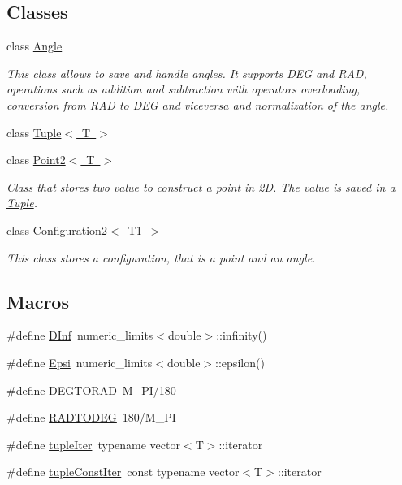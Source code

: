\subsection*{Classes}
\begin{DoxyCompactItemize}
\item 
class \mbox{\hyperlink{class_angle}{Angle}}
\begin{DoxyCompactList}\small\item\em This class allows to save and handle angles. It supports D\+EG and R\+AD, operations such as addition and subtraction with operators overloading, conversion from R\+AD to D\+EG and viceversa and normalization of the angle. \end{DoxyCompactList}\item 
class \mbox{\hyperlink{class_tuple}{Tuple$<$ T $>$}}
\item 
class \mbox{\hyperlink{class_point2}{Point2$<$ T $>$}}
\begin{DoxyCompactList}\small\item\em Class that stores two value to construct a point in 2D. The value is saved in a \mbox{\hyperlink{class_tuple}{Tuple}}. \end{DoxyCompactList}\item 
class \mbox{\hyperlink{class_configuration2}{Configuration2$<$ T1 $>$}}
\begin{DoxyCompactList}\small\item\em This class stores a configuration, that is a point and an angle. \end{DoxyCompactList}\end{DoxyCompactItemize}
\subsection*{Macros}
\begin{DoxyCompactItemize}
\item 
\#define \mbox{\hyperlink{maths_8hh_a995779faef78614d4f074b7d444de767}{D\+Inf}}~numeric\+\_\+limits$<$double$>$\+::infinity()
\item 
\#define \mbox{\hyperlink{maths_8hh_a78802b279ab85021d7f6bffe51621703}{Epsi}}~numeric\+\_\+limits$<$double$>$\+::epsilon()
\item 
\#define \mbox{\hyperlink{maths_8hh_abbfb1b8e88373781c6238d647110f5d2}{D\+E\+G\+T\+O\+R\+AD}}~M\+\_\+\+PI/180
\item 
\#define \mbox{\hyperlink{maths_8hh_a9fcbc53371e9a60b983c6b338537aa40}{R\+A\+D\+T\+O\+D\+EG}}~180/M\+\_\+\+PI
\item 
\#define \mbox{\hyperlink{maths_8hh_ad22dcdeefda7d41523cc1604953eb6cc}{tuple\+Iter}}~typename vector$<$T$>$\+::iterator
\item 
\#define \mbox{\hyperlink{maths_8hh_a2eba794860251c1b30e532df32ee4d1b}{tuple\+Const\+Iter}}~const typename vector$<$T$>$\+::iterator
\end{DoxyCompactItemize}
